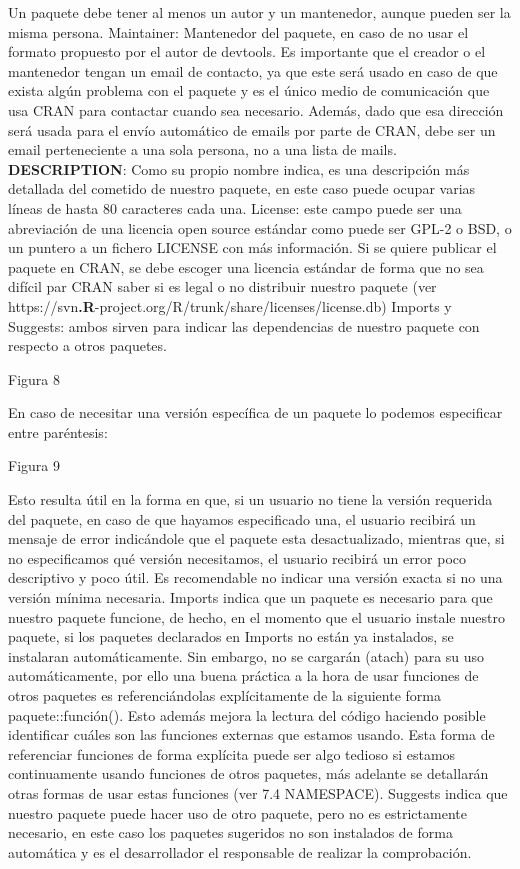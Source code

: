 Un paquete debe tener al menos un autor y un mantenedor, aunque pueden ser la misma
persona.
Maintainer: Mantenedor del paquete, en caso de no usar el formato propuesto por el autor
de devtools.
Es importante que el creador o el mantenedor tengan un email de contacto, ya que este ser\'a
usado en caso de que exista alg\'un problema con el paquete y es el \'unico medio de
comunicaci\'on que usa CRAN para contactar cuando sea necesario. Adem\'as, dado que esa
direcci\'on ser\'a usada para el env\'io autom\'atico de emails por parte de CRAN, debe ser un
email perteneciente a una sola persona, no a una lista de mails.
\textbf{DESCRIPTION}: Como su propio nombre indica, es una descripci\'on m\'as detallada del cometido
de nuestro paquete, en este caso puede ocupar varias l\'ineas de hasta 80 caracteres cada
una.
License: este campo puede ser una abreviaci\'on de una licencia open source est\'andar como
puede ser GPL-2 o BSD, o un puntero a un fichero LICENSE con m\'as informaci\'on.
Si se quiere publicar el paquete en CRAN, se debe escoger una licencia est\'andar de forma
que no sea dif\'icil par CRAN saber si es legal o no distribuir nuestro paquete (ver 
https://svn\textbf{.R}-project.org/R/trunk/share/licenses/license.db)
Imports y Suggests: ambos sirven para indicar las dependencias de nuestro paquete con
respecto a otros paquetes.

Figura 8

En caso de necesitar una versi\'on espec\'ifica de un paquete lo podemos especificar entre
par\'entesis:

Figura 9

Esto resulta \'util en la forma en que, si un usuario no tiene la versi\'on requerida del paquete,
en caso de que hayamos especificado una, el usuario recibir\'a un mensaje de error indic\'andole que el 
paquete esta desactualizado, mientras que, si no especificamos qu\'e versi\'on
necesitamos, el usuario recibir\'a un error poco descriptivo y poco \'util.
Es recomendable no indicar una versi\'on exacta si no una versi\'on m\'inima necesaria.
Imports indica que un paquete es necesario para que nuestro paquete funcione, de hecho,
en el momento que el usuario instale nuestro paquete, si los paquetes declarados en Imports
no est\'an ya instalados, se instalaran autom\'aticamente. Sin embargo, no se cargar\'an (atach)
para su uso autom\'aticamente, por ello una buena pr\'actica a la hora de usar funciones de
otros paquetes es referenci\'andolas expl\'icitamente de la siguiente forma paquete::funci\'on().
Esto adem\'as mejora la lectura del c\'odigo haciendo posible identificar cu\'ales son las funciones
externas que estamos usando.
Esta forma de referenciar funciones de forma expl\'icita puede ser algo tedioso si estamos
continuamente usando funciones de otros paquetes, m\'as adelante se detallar\'an otras formas
de usar estas funciones (ver 7.4 NAMESPACE).
Suggests indica que nuestro paquete puede hacer uso de otro paquete, pero no es
estrictamente necesario, en este caso los paquetes sugeridos no son instalados de forma
autom\'atica y es el desarrollador el responsable de realizar la comprobaci\'on.

